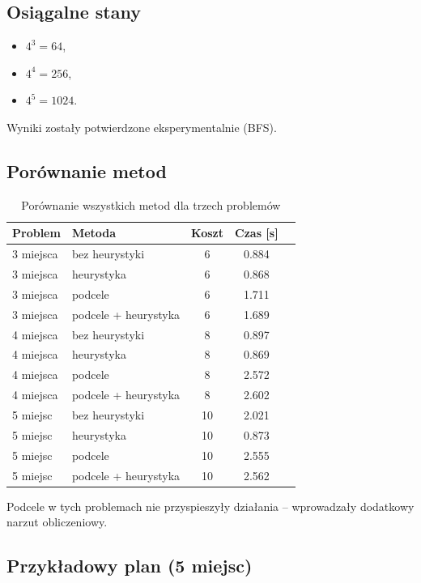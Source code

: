 \documentclass[a4paper,12pt]{article}
\begin{document}
\subsection{Osiągalne stany}

\begin{itemize}
    \item $4^3 = 64$,
    \item $4^4 = 256$,
    \item $4^5 = 1024$.
\end{itemize}

Wyniki zostały potwierdzone eksperymentalnie (BFS).

\subsection{Porównanie metod}

\begin{table}[h!]
\centering
\begin{tabular}{llccc}
\toprule
Problem & Metoda & Koszt & Czas [s] \\
\midrule
3 miejsca & bez heurystyki & 6 & 0.884 \\
3 miejsca & heurystyka & 6 & 0.868\\
3 miejsca & podcele & 6 & 1.711\\
3 miejsca & podcele + heurystyka & 6 & 1.689 \\
\midrule
4 miejsca & bez heurystyki & 8 & 0.897\\
4 miejsca & heurystyka & 8 & 0.869\\
4 miejsca & podcele & 8 & 2.572 \\
4 miejsca & podcele + heurystyka & 8 & 2.602 \\
\midrule
5 miejsc & bez heurystyki & 10 & 2.021\\
5 miejsc & heurystyka & 10 & 0.873\\
5 miejsc & podcele & 10 & 2.555 \\
5 miejsc & podcele + heurystyka & 10 & 2.562\\
\bottomrule
\end{tabular}
\caption{Porównanie wszystkich metod dla trzech problemów}
\end{table}

Podcele w tych problemach nie przyspieszyły działania – wprowadzały dodatkowy narzut obliczeniowy.

\subsection{Przykładowy plan (5 miejsc)}
\end{document}
